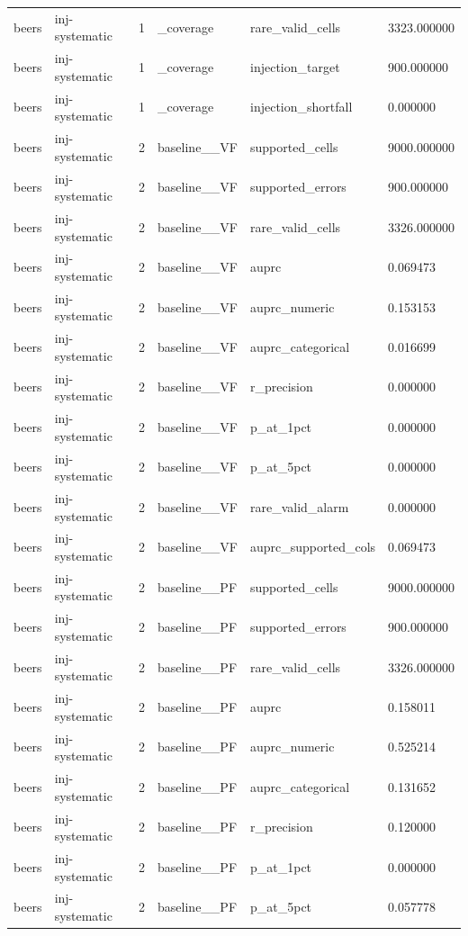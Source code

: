 \begin{tabular}{llllll}
beers & inj-systematic & 1 & \_coverage & rare\_valid\_cells & 3323.000000 \\
beers & inj-systematic & 1 & \_coverage & injection\_target & 900.000000 \\
beers & inj-systematic & 1 & \_coverage & injection\_shortfall & 0.000000 \\
beers & inj-systematic & 2 & baseline\_\_VF & supported\_cells & 9000.000000 \\
beers & inj-systematic & 2 & baseline\_\_VF & supported\_errors & 900.000000 \\
beers & inj-systematic & 2 & baseline\_\_VF & rare\_valid\_cells & 3326.000000 \\
beers & inj-systematic & 2 & baseline\_\_VF & auprc & 0.069473 \\
beers & inj-systematic & 2 & baseline\_\_VF & auprc\_numeric & 0.153153 \\
beers & inj-systematic & 2 & baseline\_\_VF & auprc\_categorical & 0.016699 \\
beers & inj-systematic & 2 & baseline\_\_VF & r\_precision & 0.000000 \\
beers & inj-systematic & 2 & baseline\_\_VF & p\_at\_1pct & 0.000000 \\
beers & inj-systematic & 2 & baseline\_\_VF & p\_at\_5pct & 0.000000 \\
beers & inj-systematic & 2 & baseline\_\_VF & rare\_valid\_alarm & 0.000000 \\
beers & inj-systematic & 2 & baseline\_\_VF & auprc\_supported\_cols & 0.069473 \\
beers & inj-systematic & 2 & baseline\_\_PF & supported\_cells & 9000.000000 \\
beers & inj-systematic & 2 & baseline\_\_PF & supported\_errors & 900.000000 \\
beers & inj-systematic & 2 & baseline\_\_PF & rare\_valid\_cells & 3326.000000 \\
beers & inj-systematic & 2 & baseline\_\_PF & auprc & 0.158011 \\
beers & inj-systematic & 2 & baseline\_\_PF & auprc\_numeric & 0.525214 \\
beers & inj-systematic & 2 & baseline\_\_PF & auprc\_categorical & 0.131652 \\
beers & inj-systematic & 2 & baseline\_\_PF & r\_precision & 0.120000 \\
beers & inj-systematic & 2 & baseline\_\_PF & p\_at\_1pct & 0.000000 \\
beers & inj-systematic & 2 & baseline\_\_PF & p\_at\_5pct & 0.057778 \\

\end{tabular}
